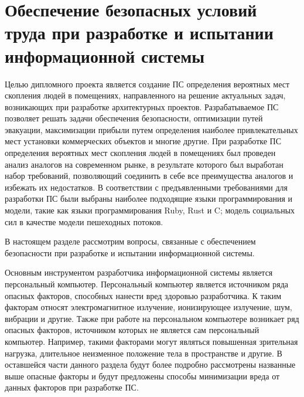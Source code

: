 \section{Обеспечение безопасных условий труда при разработке и испытании информационной системы}

Целью дипломного проекта является создание ПС определения вероятных мест скопления людей в помещениях,
направленного на решение актуальных задач, возникающих при разработке архитектурных проектов.
Разрабатываемое ПС позволяет решать задачи обеспечения безопасности, оптимизации путей эвакуации,
максимизации прибыли путем определения наиболее привлекательных мест установки коммерческих объектов и многие другие.
При разработке ПС определения вероятных мест скопления людей в помещениях был проведен анализ аналогов на современном рынке,
в результате которого был выработан набор требований, позволяющий соединить в себе все преимущества аналогов и избежать их недостатков.
В соответствии с предъявленными требованиями для разработки ПС были выбраны наиболее подходящие языки программирования и модели, такие как
языки программирования Ruby, Rust и C; модель социальных сил в качестве модели пешеходных потоков.

В настоящем разделе рассмотрим вопросы, связанные с обеспечением безопасности при разработке и испытании информационной системы.

Основным инструментом разработчика информационной системы является персональный компьютер.
Персональный компьютер является источником ряда опасных факторов, способных нанести вред здоровью разработчика.
К таким факторам относят электромагнитное излучение, ионизирующее излучение, шум, вибрации и другие.
Также при работе на персональном компьютере возникает ряд опасных факторов, источником которых не является сам персональный компьютер.
Например, такими факторами могут являться повышенная зрительная нагрузка, длительное неизменное положение тела в пространстве и другие.
В оставшейся части данного раздела будут более подробно рассмотрены названные выше опасные факторы
и будут предложены способы минимизации вреда от данных факторов при разработке ПС.

